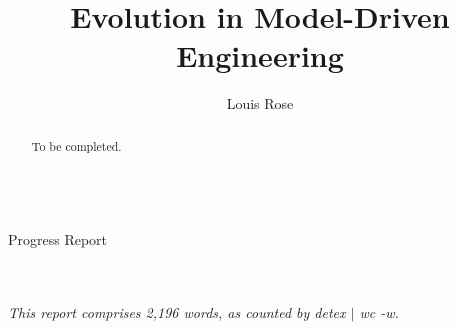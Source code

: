 \documentclass[a4paper,10pt]{article}
\title{Evolution in Model-Driven Engineering}
\author{Louis Rose}
\makeatletter
\renewcommand{\maketitle}{
  \begin{titlepage}
    \center
    \vspace*{\stretch{1}}
    \textsf{\huge \bfseries\sf \@title}\\
    \bigskip
    {\LARGE Progress Report}\\
    \vspace*{\stretch{1}}
    {\Large \@author}\\
    \bigskip
    {\Large \@date}\\
    \vspace*{\stretch{2}}
  \end{titlepage}
}
\makeatother
\begin{document}

\maketitle

\begin{abstract}
To be completed.
\end{abstract}

\vspace{2mm}

\begin{center}
  \small{\textit{This report comprises 2,196 words, as counted by detex $|$ wc -w.}}
\end{center}

\newpage
\tableofcontents
\newpage








\end{document}
